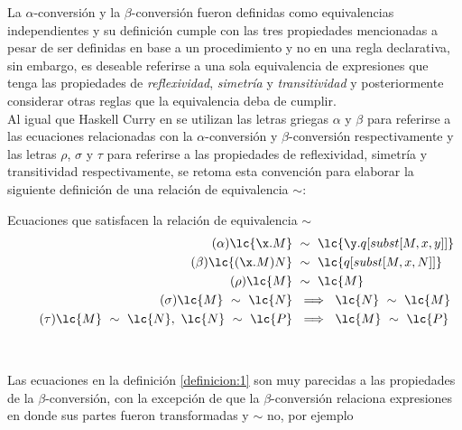 La \(\alpha\)-conversión y la \(\beta\)-conversión fueron definidas como equivalencias independientes y su definición cumple con las tres propiedades mencionadas a pesar de ser definidas en base a un procedimiento y no en una regla declarativa, sin embargo, es deseable referirse a una sola equivalencia de expresiones que tenga las propiedades de \emph{reflexividad}, \emph{simetría} y \emph{transitividad} y posteriormente considerar otras reglas que la equivalencia deba de cumplir. \\

Al igual que Haskell Curry en \cite[p.~59]{Curry:CombinatoryLogicI} se utilizan las letras griegas \(\alpha\) y \(\beta\) para referirse a las ecuaciones relacionadas con la \(\alpha\)-conversión y \(\beta\)-conversión respectivamente y las letras \(\rho\), \(\sigma\) y \(\tau\) para referirse a las propiedades de reflexividad, simetría y transitividad respectivamente, se retoma esta convención para elaborar la siguiente definición de una relación de equivalencia \(\sim\): \\

\begin{defi} Ecuaciones que satisfacen la relación de equivalencia \(\sim\)
  \label{definicion:1}
  \begin{subequations}
    \begin{align}
      \label{definicion:1:alpha} \tag{\ensuremath{\alpha}}
      \lc{\x.M}\ &\sim\ \lc{\y.q[subst[M,x,y]]}
      \\
      \label{definicion:1:beta} \tag{\ensuremath{\beta}}
      \lc{(\x.M)N}\ &\sim\ \lc{q[subst[M,x,N]]}
      \\
      \label{definicion:1:rho} \tag{\ensuremath{\rho}}
      \lc{M}\ &\sim\ \lc{M}
      \\
      \label{definicion:1:sigma} \tag{\ensuremath{\sigma}}
      \lc{M}\ \sim\ \lc{N}\ &\implies\ \lc{N}\ \sim\ \lc{M}
      \\
      \label{definicion:1:tau} \tag{\ensuremath{\tau}}
      \lc{M}\ \sim\ \lc{N},\ \lc{N}\ \sim\ \lc{P}\ &\implies\ \lc{M}\ \sim\ \lc{P}
    \end{align}
  \end{subequations}
\end{defi} \

Las ecuaciones en la definición \ref{definicion:1} son muy parecidas a las propiedades de la \(\beta\)-conversión, con la excepción de que la \(\beta\)-conversión relaciona expresiones en donde sus partes fueron transformadas y \(\sim\) no, por ejemplo \\

